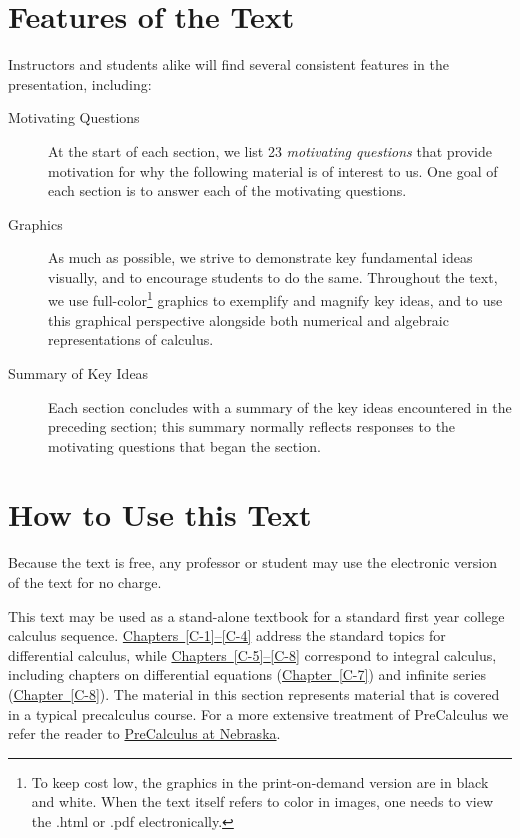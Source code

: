\documentclass[10pt,]{book}
\theoremstyle{plain}
\theoremstyle{definition}
\theoremstyle{definition}
\theoremstyle{definition}
\theoremstyle{definition}
\numberwithin{equation}{section}
\let\oldchapter\chapter
\renewcommand\chapter{\clearpage\gdef\znewpage{\global\let\znewpage\clearpage}\oldchapter}
\begin{document}
\chapter*{Features of the Text}\label{preface-3}
\hypertarget{p-14}{}%
Instructors and students alike will find several consistent features in the presentation, including: \leavevmode%
\begin{description}
\item[{Motivating Questions}]\hypertarget{li-1}{}\hypertarget{p-15}{}%
At the start of each section, we list 2\textendash{}3 \emph{motivating questions} that provide motivation for why the following material is of interest to us. One goal of each section is to answer each of the motivating questions.%
\item[{Graphics}]\hypertarget{li-2}{}\hypertarget{p-16}{}%
As much as possible, we strive to demonstrate key fundamental ideas visually, and to encourage students to do the same. Throughout the text, we use full-color\footnote{To keep cost low, the graphics in the print-on-demand version are in black and white. When the text itself refers to color in images, one needs to view the .html or .pdf electronically.\label{fn-1}} graphics to exemplify and magnify key ideas, and to use this graphical perspective alongside both numerical and algebraic representations of calculus.%
\item[{Summary of Key Ideas}]\hypertarget{li-3}{}\hypertarget{p-17}{}%
Each section concludes with a summary of the key ideas encountered in the preceding section; this summary normally reflects responses to the motivating questions that began the section.%
\end{description}
%
\chapter*{How to Use this Text}\label{preface-4}
\hypertarget{p-18}{}%
Because the text is free, any professor or student may use the electronic version of the text for no charge.%
\par
\hypertarget{p-19}{}%
This text may be used as a stand-alone textbook for a standard first year college calculus sequence. \hyperref[C-1]{Chapters~\ref{C-1}--\ref{C-4}} address the standard topics for differential calculus, while \hyperref[C-5]{Chapters~\ref{C-5}--\ref{C-8}} correspond to integral calculus, including chapters on differential equations (\hyperref[C-7]{Chapter~\ref{C-7}}) and infinite series (\hyperref[C-8]{Chapter~\ref{C-8}}).%
\setcounter{tocdepth}{1}
\renewcommand*\contentsname{Contents}
\tableofcontents
\mainmatter
\frontmatter
\hypertarget{p-20}{}%
The material in this section represents material that is covered in a typical precalculus course.  For a more extensive treatment of PreCalculus we refer the reader to \href{https://mathbooks.unl.edu/PreCalculus}{PreCalculus at Nebraska}.%
\typeout{************************************************}
\typeout{************************************************}
\end{document}
